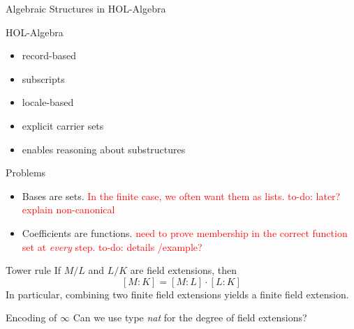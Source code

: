 \documentclass[%
	sans,
	12pt,
]{beamer}
\newcommand{\high}[1]{{\usebeamercolor[fg]{structure} #1}}
\newcommand{\bad}[1]{\textcolor{red}{#1}}
\begin{document}
\begin{frame}
\begin{center}
\huge\high{Algebraic Structures in HOL-Algebra}%
\end{center}
\end{frame}

\begin{frame}{HOL-Algebra}
\begin{itemize}
	\item record-based \pause%
	\item subscripts \pause%
	\item locale-based \pause%
	\item explicit carrier sets \pause
	\item enables reasoning about substructures	\pause%
\end{itemize}
\end{frame}

\begin{frame}{Problems}
\begin{itemize}
\item Bases are sets.
\bad{In the finite case, we often want them as lists. to-do: later? explain non-canonical}
\item Coefficients are functions.
\bad{need to prove membership in the correct function set at \emph{every} step.
	 to-do: details /example?}
\end{itemize}
\end{frame}

\begin{frame}{Tower rule}
If $M/L$ and $L/K$ are field extensions, then
\[[M : K] = [M : L] \cdot [L : K]\]\pause %
In particular, combining two finite field extensions yields a finite field extension. %
\end{frame}

\begin{frame}{Encoding of $\infty$}
Can we use type \emph{nat} for the degree of field extensions?\pause
{}
\end{frame}
\end{document}
